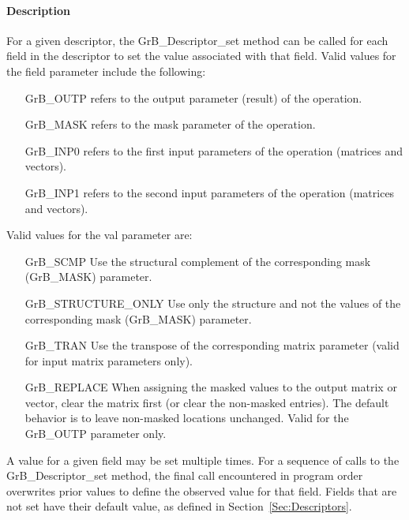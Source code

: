 \paragraph{Description}

For a given descriptor, the {\sf GrB\_Descriptor\_set} method can be called for each
field in the descriptor to set the value associated with that field.  Valid values for the {\sf field} 
parameter include the following:

\begin{itemize}[leftmargin=1.5in]
\item[{\sf GrB\_OUTP}]   refers to the output parameter (result) of the operation.
\item[{\sf GrB\_MASK}]   refers to the mask parameter of the operation.
\item[{\sf GrB\_INP0}]   refers to the first input parameters of the operation (matrices and vectors). 
\item[{\sf GrB\_INP1}]   refers to the second input parameters of the operation (matrices and vectors). 
\end{itemize}

Valid values for the {\sf val} parameter are:

\begin{itemize}[leftmargin=1.8in]
\item[{\sf GrB\_SCMP}]    Use the structural complement of the corresponding mask
			  ({\sf GrB\_MASK}) parameter.
\item[{\sf GrB\_STRUCTURE\_ONLY}]  Use only the structure and not the values of the corresponding mask
			  ({\sf GrB\_MASK}) parameter. 
\item[{\sf GrB\_TRAN}]    Use the transpose of the corresponding matrix parameter
                          (valid for input matrix parameters only).
\item[{\sf GrB\_REPLACE}] When assigning the masked values to the output matrix
                          or vector, clear the matrix first (or clear the
                          non-masked entries).  The default behavior is to leave
                          non-masked locations unchanged.  Valid for the
                          {\sf GrB\_OUTP} parameter only.
\end{itemize}

 A value for a given field may be set multiple times.   For a sequence of calls to the {\sf GrB\_Descriptor\_set} method,
 the final call encountered in program order overwrites prior values to define the observed value for that field.
 Fields that are not set have their default value, as defined in Section~\ref{Sec:Descriptors}.
